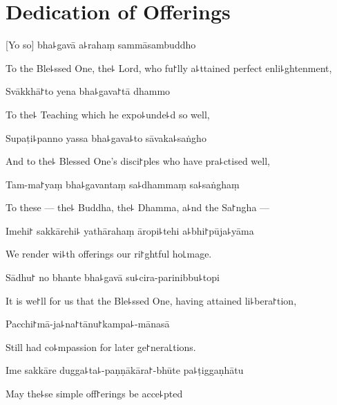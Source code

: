 
\chapter{Dedication of Offerings}                   %

%
[Yo so] bha꜕gavā a꜕rahaṃ sammāsambuddho

\begin{english}
To the Ble꜕ssed One, the꜕ Lord, who fu꜓lly a꜕ttained perfect enli꜕ghtenment,
\end{english}

Svākkhā꜓to yena bha꜕gava꜓tā dhammo

\begin{english}
To the꜕ Teaching which he expo꜕unde꜕d so well,
\end{english}

Supaṭi꜕panno yassa bha꜕gava꜕to sāvaka꜕saṅgho

\begin{english}
And to the꜕ Blessed One's disci꜓ples who have pra꜕ctised well,
\end{english}

Tam-ma꜓yaṃ bha꜕gavantaṃ sa꜕dhammaṃ sa꜕saṅghaṃ

\begin{english}
To these --- the꜕ Buddha, the꜕ Dhamma, a꜕nd the Sa꜓ngha ---
\end{english}

Imehi꜓ sakkārehi꜕ yathārahaṃ āropi꜕tehi a꜕bhi꜓pūja꜕yāma

\begin{english}
We render wi꜕th offerings our ri꜓ghtful ho꜖mage.
\end{english}

Sādhu꜓ no bhante bha꜕gavā su꜕cira-parinibbu꜕topi

\begin{english}
It is we꜓ll for us that the Ble꜕ssed One, having attained li꜕bera꜓tion,
\end{english}

Pacchi꜓mā-ja꜕na꜓tānu꜓kampa꜕-mānasā

\begin{english}
Still had co꜕mpassion for later ge꜓nera꜖tions.
\end{english}

Ime sakkāre dugga꜕ta꜕-paṇṇākāra꜓-bhūte pa꜕ṭiggaṇhātu

\begin{english}
May the꜕se simple off꜓erings be acce꜕pted
\end{english}

